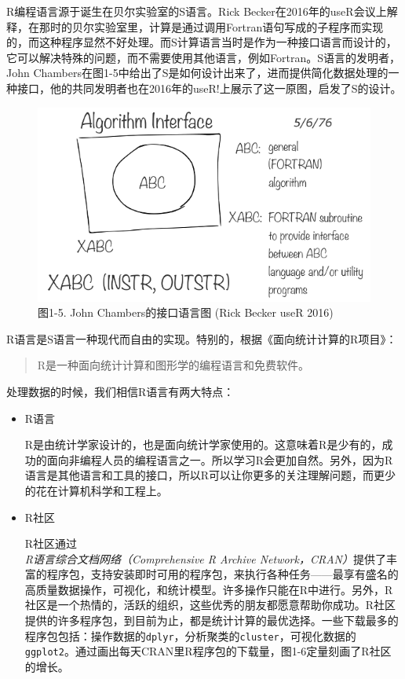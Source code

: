 \documentclass[
]{article}
\begin{document}
R编程语言源于诞生在贝尔实验室的S语言。Rick
Becker在2016年的useR会议上解释，在那时的贝尔实验室里，计算是通过调用Fortran语句写成的子程序而实现的，而这种程序显然不好处理。而S计算语言当时是作为一种接口语言而设计的，它可以解决特殊的问题，而不需要使用其他语言，例如Fortran。S语言的发明者，John
Chambers在图1-5中给出了S是如何设计出来了，进而提供简化数据处理的一种接口，他的共同发明者也在2016年的useR!上展示了这一原图，启发了S的设计。

\begin{figure}
\centering
\includegraphics{figures/1_5.png}
\caption{图1-5. John Chambers的接口语言图 (Rick Becker useR 2016)}
\end{figure}

R语言是S语言一种现代而自由的实现。特别的，根据《面向统计计算的R项目》：

\begin{quote}
R是一种面向统计计算和图形学的编程语言和免费软件。
\end{quote}

处理数据的时候，我们相信R语言有两大特点：

\begin{itemize}
\item
  R语言

  R是由统计学家设计的，也是面向统计学家使用的。这意味着R是少有的，成功的面向非编程人员的编程语言之一。所以学习R会更加自然。另外，因为R语言是其他语言和工具的接口，所以R可以让你更多的关注理解问题，而更少的花在计算机科学和工程上。
\item
  R社区

  R社区通过\emph{R语言综合文档网络（Comprehensive R Archive
  Network，CRAN）}提供了丰富的程序包，支持安装即时可用的程序包，来执行各种任务------最享有盛名的高质量数据操作，可视化，和统计模型。许多操作只能在R中进行。另外，R社区是一个热情的，活跃的组织，这些优秀的朋友都愿意帮助你成功。R社区提供的许多程序包，到目前为止，都是统计计算的最优选择。一些下载最多的程序包包括：操作数据的\texttt{dplyr}，分析聚类的\texttt{cluster}，可视化数据的\texttt{ggplot2}。通过画出每天CRAN里R程序包的下载量，图1-6定量刻画了R社区的增长。
\end{itemize}
\end{document}
